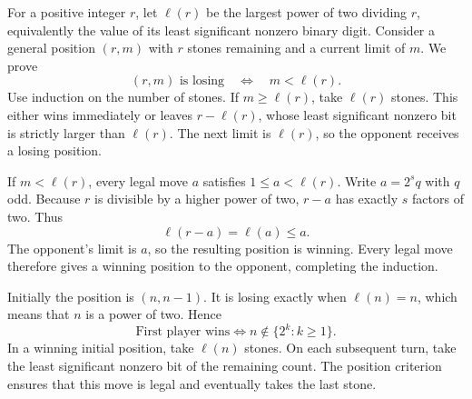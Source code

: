 For a positive integer $r$, let $\ell(r)$ be the largest power of two dividing $r$, equivalently the value of its least significant nonzero binary digit. Consider a general position $(r,m)$ with $r$ stones remaining and a current limit of $m$. We prove
\[
 (r,m)\text{ is losing}\quad\Longleftrightarrow\quad m<\ell(r).
\]
Use induction on the number of stones. If $m\ge\ell(r)$, take $\ell(r)$ stones. This either wins immediately or leaves $r-\ell(r)$, whose least significant nonzero bit is strictly larger than $\ell(r)$. The next limit is $\ell(r)$, so the opponent receives a losing position.

If $m<\ell(r)$, every legal move $a$ satisfies $1\le a<\ell(r)$. Write $a=2^s q$ with $q$ odd. Because $r$ is divisible by a higher power of two, $r-a$ has exactly $s$ factors of two. Thus
\[
 \ell(r-a)=\ell(a)\le a.
\]
The opponent's limit is $a$, so the resulting position is winning. Every legal move therefore gives a winning position to the opponent, completing the induction.

Initially the position is $(n,n-1)$. It is losing exactly when $\ell(n)=n$, which means that $n$ is a power of two. Hence
\[
 \boxed{\text{First player wins}\iff n\notin\{2^k:k\ge1\}.}
\]
In a winning initial position, take $\ell(n)$ stones. On each subsequent turn, take the least significant nonzero bit of the remaining count. The position criterion ensures that this move is legal and eventually takes the last stone.
